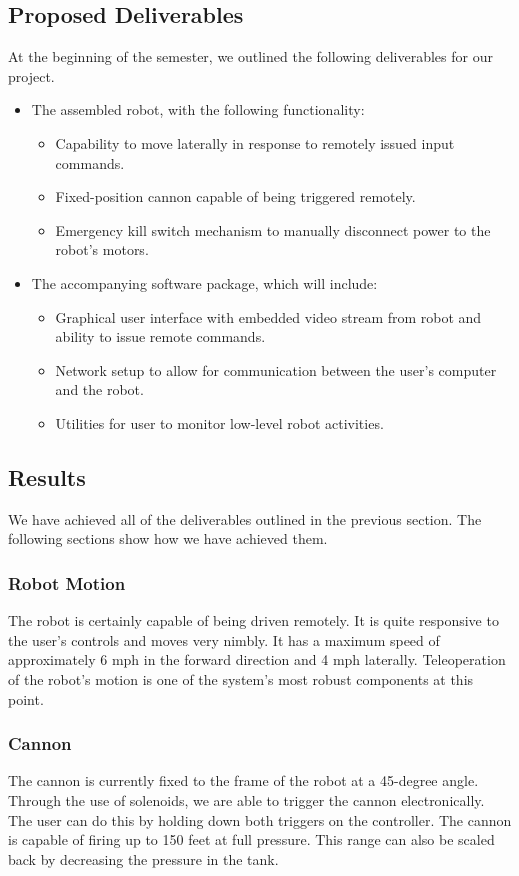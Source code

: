 \documentclass[letterpaper,12pt]{article}
\begin{document}
\subsection{Proposed Deliverables}
At the beginning of the semester, we outlined the following deliverables for our
project.

\begin{itemize}
\item The assembled robot, with the following functionality:
  \begin{itemize}
  \item Capability to move laterally in response to remotely issued input commands.
  \item Fixed-position cannon capable of being triggered remotely.
  \item Emergency kill switch mechanism to manually disconnect power to the
    robot's motors.
  \end{itemize}
\item The accompanying software package, which will include:
  \begin{itemize}
  \item Graphical user interface with embedded video stream from robot and
    ability to issue remote commands.
  \item Network setup to allow for communication between the user's computer and
    the robot.
  \item Utilities for user to monitor low-level robot activities.
  \end{itemize}
\end{itemize}

\subsection{Results}
We have achieved all of the deliverables outlined in the previous section. The
following sections show how we have achieved them.

\subsubsection{Robot Motion}
The robot is certainly capable of being driven remotely. It is quite responsive
to the user's controls and moves very nimbly. It has a maximum speed of
approximately 6 mph in the forward direction and 4 mph laterally. Teleoperation
of the robot's motion is one of the system's most robust components at this
point.

\subsubsection{Cannon}
The cannon is currently fixed to the frame of the robot at a 45-degree
angle. Through the use of solenoids, we are able to trigger the cannon
electronically. The user can do this by holding down both triggers on the
controller. The cannon is capable of firing up to 150 feet at full
pressure. This range can also be scaled back by decreasing the pressure in the
tank.
\end{document}
